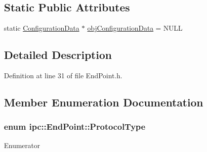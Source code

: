 \subsection*{Static Public Attributes}
\begin{DoxyCompactItemize}
\item 
static \hyperlink{classConfigurationData}{Configuration\+Data} $\ast$ \hyperlink{classipc_1_1EndPoint_a7a04190956500a628f63f5d692ca6857}{obj\+Configuration\+Data} = N\+U\+LL
\end{DoxyCompactItemize}


\subsection{Detailed Description}


Definition at line 31 of file End\+Point.\+h.



\subsection{Member Enumeration Documentation}
\subsubsection[{\texorpdfstring{Protocol\+Type}{ProtocolType}}]{\setlength{\rightskip}{0pt plus 5cm}enum {\bf ipc\+::\+End\+Point\+::\+Protocol\+Type}}\hypertarget{classipc_1_1EndPoint_adcdf30d3a61d3d342529b1fb8b0bbd72}{}\label{classipc_1_1EndPoint_adcdf30d3a61d3d342529b1fb8b0bbd72}
\begin{Desc}
\item[Enumerator]\par
\begin{description}
\item[{\em 
T\+CP\hypertarget{classipc_1_1EndPoint_adcdf30d3a61d3d342529b1fb8b0bbd72a79ed024dca934b3dbe5150c824fa3f85}{}\label{classipc_1_1EndPoint_adcdf30d3a61d3d342529b1fb8b0bbd72a79ed024dca934b3dbe5150c824fa3f85}
}]\item[{\em 
U\+DP\hypertarget{classipc_1_1EndPoint_adcdf30d3a61d3d342529b1fb8b0bbd72a2e5b645e7fb05031f1c75d298db757b2}{}\label{classipc_1_1EndPoint_adcdf30d3a61d3d342529b1fb8b0bbd72a2e5b645e7fb05031f1c75d298db757b2}
}]\end{description}
\end{Desc}


